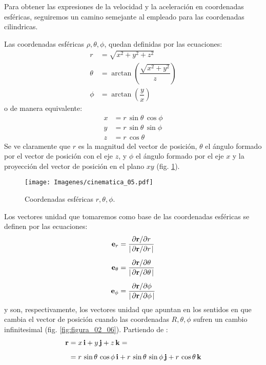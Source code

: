 \documentclass[12pt]{article}
\begin{document}
Para obtener las expresiones de la velocidad y la aceleración en coordenadas esféricas, seguiremos un camino semejante al empleado para las coordenadas cilindricas. 
\par
Las coordenadas esféricas $\rho, \theta, \phi$, quedan definidas por las ecuaciones:
\begin{align}
r &= \sqrt{x^{2} + y^{2} + z^{2}} \label{eq:ecuacion_02_30} \\
\theta &= \arctan \left( \dfrac{\sqrt{x^{2} + y^{2}}}{z} \right) \label{eq:ecuacion_02_31} \\
\phi &= \arctan \left( \dfrac{y}{x} \right) \label{eq:ecuacion_02_32}
\end{align}
o de manera equivalente:
\begin{align}
    x &= r \, \sin \theta \, \cos \phi \label{eq:ecuacion_02_33} \\
    y &= r \, \sin \theta \, \sin \phi \label{eq:ecuacion_02_34} \\
    z &= r \, \cos \theta \label{eq:ecuacion_02_35}
\end{align}
Se ve claramente que $r$ es la magnitud del vector de posición, $\theta$ el ángulo formado por el vector de posición con el eje $z$, y $\phi$ el ángulo formado por el eje $x$ y la proyección del vector de posición en el plano $x y$ (fig. \ref{fig:figura_02_05}). 
\begin{figure}[H]
    \centering
    \texttt{[image: Imagenes/cinematica\_05.pdf]}
    \caption{Coordenadas esféricas $r, \theta, \phi$.}
    \label{fig:figura_02_05}
\end{figure}
Los vectores unidad que tomaremos como base de las coordenadas esféricas se definen por las ecuaciones:
\begin{align}
\vb{e}_{r} &= \dfrac{\pdv*{\vb{r}}{r}}{\abs{\pdv*{\vb{r}}{r}}} \label{eq:ecuacion_02_36} \\[0.5em]
\vb{e}_{\theta} &= \dfrac{\pdv*{\vb{r}}{\theta}}{\abs{\pdv*{\vb{r}}{\theta}}} \label{eq:ecuacion_02_37} \\[0.5em]
\vb{e}_{\phi} &= \dfrac{\pdv*{\vb{r}}{\phi}}{\abs{\pdv*{\vb{r}}{\phi}}} \label{eq:ecuacion_02_38}
\end{align}
y son, respectivamente, los vectores unidad que apuntan en los sentidos en que cambia el vector de posición cuando las coordenadas $R, \theta, \phi$ sufren un cambio infinitesimal (fig. \ref{fig:figura_02_06}). Partiendo de :
\begin{align}
\begin{aligned}
\vb{r} &= x \, \vb{i} + y \, \vb{j} + z \, \vb{k} = \\[0.5em]
&= r \, \sin \theta \, \cos \phi \, \vb{i} + r \, \sin \theta \, \sin \phi \, \vb{j} + r \, \cos \theta \, \vb{k}
\end{aligned}
\label{eq:ecuacion_02_39}
\end{align}
\end{document}
